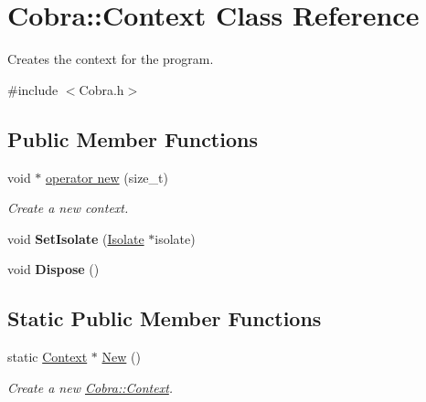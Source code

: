 \hypertarget{class_cobra_1_1_context}{\section{Cobra\+:\+:Context Class Reference}
\label{class_cobra_1_1_context}
}


Creates the context for the program.  




{\ttfamily \#include $<$Cobra.\+h$>$}

\subsection*{Public Member Functions}
\begin{DoxyCompactItemize}
\item 
void $\ast$ \hyperlink{class_cobra_1_1_context_ac34fa8ed39938076d0441adabcbc1cd5}{operator new} (size\+\_\+t)
\begin{DoxyCompactList}\small\item\em Create a new context. \end{DoxyCompactList}\item 
\hypertarget{class_cobra_1_1_context_ab0c0a9a4910865623f0c89b298609f48}{void {\bfseries Set\+Isolate} (\hyperlink{class_cobra_1_1_isolate}{Isolate} $\ast$isolate)}\label{class_cobra_1_1_context_ab0c0a9a4910865623f0c89b298609f48}

\item 
\hypertarget{class_cobra_1_1_context_a204aa25e5afeb2bb3f09db6b3fc2a86a}{void {\bfseries Dispose} ()}\label{class_cobra_1_1_context_a204aa25e5afeb2bb3f09db6b3fc2a86a}

\end{DoxyCompactItemize}
\subsection*{Static Public Member Functions}
\begin{DoxyCompactItemize}
\item 
static \hyperlink{class_cobra_1_1_context}{Context} $\ast$ \hyperlink{class_cobra_1_1_context_af5e66888a00a8e0f350e603c2ccbfe9d}{New} ()
\begin{DoxyCompactList}\small\item\em Create a new \hyperlink{class_cobra_1_1_context}{Cobra\+::\+Context}. \end{DoxyCompactList}\end{DoxyCompactItemize}


